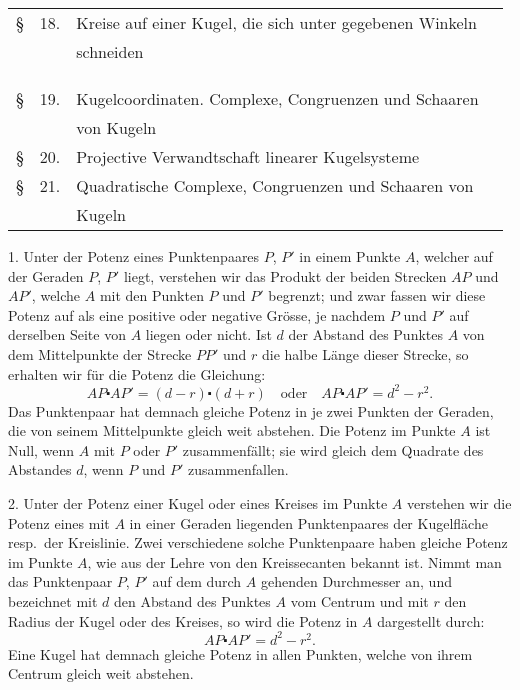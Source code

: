 \begin{tabular}{l@{ }rl@{}r}
\S &18.& Kreise auf einer Kugel, die sich unter gegebenen Winkeln\\
&& schneiden~\dotfill & \pageref{p18} \\
\\
&&\parbox{0.82\textwidth}{\centering {}}\\
\\
\S &19.& Kugelcoordinaten. Complexe, Congruenzen und Schaaren\\
&& von Kugeln~\dotfill & \pageref{p19} \\
\S &20.& Projective Verwandtschaft linearer Kugelsysteme~\dotfill & \pageref{p20} \\
\S & 21. &Quadratische Complexe, Congruenzen und Schaaren von\\
&& Kugeln~\dotfill & \pageref{p21}
\end{tabular}

\addtolength{\parskip}{1ex}
\newpage
{}\label{p1}


\hspace{\parindent}%
1. Unter der {\glqq}Potenz{\grqq} eines Punktenpaares $P$, $P'$ in
einem Punkte $A$, welcher auf der Geraden $P$, $P'$ liegt, verstehen
wir das Produkt der beiden Strecken $AP$ und $AP'$,
welche $A$ mit den Punkten $P$ und $P'$ begrenzt; und zwar
fassen wir diese Potenz auf als eine positive oder negative
Gr\"osse, je nachdem $P$ und $P'$ auf derselben Seite von $A$
liegen oder nicht. Ist $d$ der Abstand des Punktes $A$ von
dem Mittelpunkte der Strecke $PP'$ und $r$ die halbe L\"ange
dieser Strecke, so erhalten wir f\"ur die Potenz die Gleichung:
\[
AP \centerdot AP' = (d-r) \centerdot (d + r) \quad \text{oder} \quad AP \centerdot AP' = d^2 - r^2.
\]
Das Punktenpaar hat demnach gleiche Potenz in je zwei
Punkten der Geraden, die von seinem Mittelpunkte gleich
weit abstehen. Die Potenz im Punkte $A$ ist Null, wenn $A$
mit $P$ oder $P'$ zusammenf\"allt; sie wird gleich dem Quadrate
des Abstandes $d$, wenn $P$ und $P'$ zusammenfallen.

2. Unter der {\glqq}Potenz einer Kugel oder eines Kreises
im Punkte $A${\grqq} verstehen wir die Potenz eines mit $A$ in einer
Geraden liegenden Punktenpaares der Kugelfl\"ache resp.\ der
Kreislinie. Zwei verschiedene solche Punktenpaare haben
gleiche Potenz im Punkte $A$, wie aus der Lehre von den
Kreissecanten bekannt ist. Nimmt man das Punktenpaar
$P$, $P'$ auf dem durch $A$ gehenden Durchmesser an, und bezeichnet
mit $d$ den Abstand des Punktes $A$ vom Centrum
und mit $r$ den Radius der Kugel oder des Kreises, so wird
die Potenz in $A$ dargestellt durch:
\[
AP \centerdot AP' = d^2 -r^2.
\]
Eine Kugel hat demnach gleiche Potenz in allen Punkten,
welche von ihrem Centrum gleich weit abstehen.

